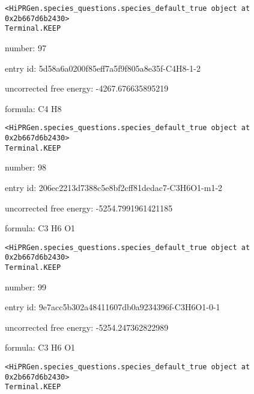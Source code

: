 \documentclass{article}
\begin{document}
\vspace{1cm}
\begin{verbatim}
<HiPRGen.species_questions.species_default_true object at 0x2b667d6b2430>
Terminal.KEEP
\end{verbatim}


number: 97



entry id: 5d58a6a0200f85eff7a5f9f805a8e35f-C4H8-1-2



uncorrected free energy: -4267.676635895219



formula: C4 H8


\vspace{1cm}
\begin{verbatim}
<HiPRGen.species_questions.species_default_true object at 0x2b667d6b2430>
Terminal.KEEP
\end{verbatim}


number: 98



entry id: 206ec2213d7388c5e8bf2cff81dedac7-C3H6O1-m1-2



uncorrected free energy: -5254.7991961421185



formula: C3 H6 O1


\vspace{1cm}
\begin{verbatim}
<HiPRGen.species_questions.species_default_true object at 0x2b667d6b2430>
Terminal.KEEP
\end{verbatim}


number: 99



entry id: 9e7acc5b302a48411607db0a9234396f-C3H6O1-0-1



uncorrected free energy: -5254.247362822989



formula: C3 H6 O1


\vspace{1cm}
\begin{verbatim}
<HiPRGen.species_questions.species_default_true object at 0x2b667d6b2430>
Terminal.KEEP
\end{verbatim}
\end{document}
